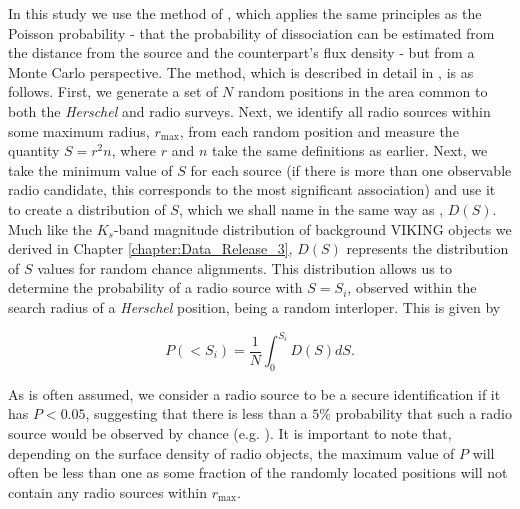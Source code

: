 In this study we use the method of \citealt{Lilly_1999}, which applies the same principles as the Poisson probability - that the probability of dissociation can be estimated from the distance from the source and the counterpart's flux density - but from a Monte Carlo perspective. The method, which is described in detail in \citealt{Dye_2009}, is as follows. First, we generate a set of $N$ random positions in the area common to both the \textit{Herschel} and radio surveys. Next, we identify all radio sources within some maximum radius, $r_{\textrm{max}}$, from each random position and measure the quantity $S = r^2n$, where $r$ and $n$ take the same definitions as earlier. Next, we take the minimum value of $S$ for each source (if there is more than one observable radio candidate, this corresponds to the most significant association) and use it to create a distribution of $S$, which we shall name in the same way as \citealt{Dye_2009}, $D(S)$. Much like the $K_s$-band magnitude distribution of background VIKING objects we derived in Chapter \ref{chapter:Data_Release_3}, $D(S)$ represents the distribution of $S$ values for random chance alignments. This distribution allows us to determine the probability of a radio source with $S = S_i$, observed within the search radius of a \textit{Herschel} position, being a random interloper. This is given by

\begin{equation}
    P(< S_i) = \frac{1}{N}\int_0^{S_i}D(S) dS.
    \label{eq:probability_frequentist}
\end{equation}

As is often assumed, we consider a radio source to be a secure identification if it has $P < 0.05$, suggesting that there is less than a $5\%$ probability that such a radio source would be observed by chance (e.g. \citealt{Ivison_2002, Ivison_2005, Pope_2006}). It is important to note that, depending on the surface density of radio objects, the maximum value of $P$ will often be less than one as some fraction of the randomly located positions will not contain any radio sources within $r_{\textrm{max}}$. 

